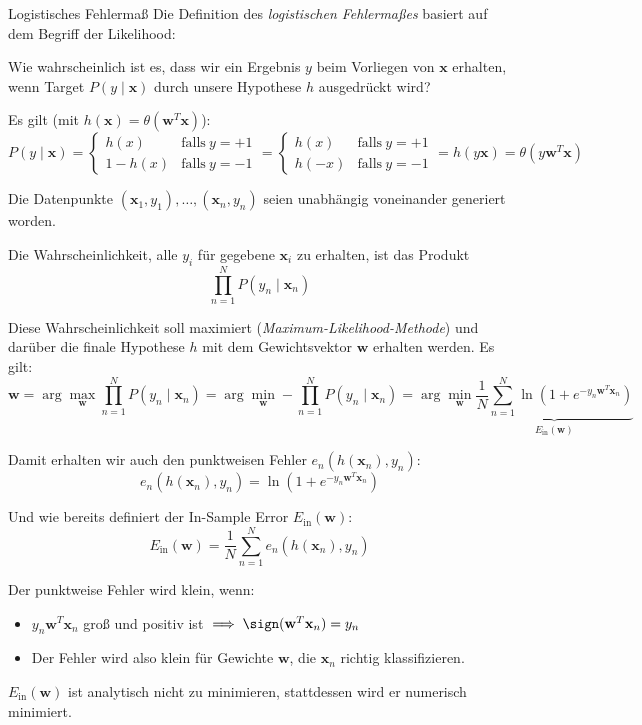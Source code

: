 \begin{defi}{Logistisches Fehlermaß}
    Die Definition des \emph{logistischen Fehlermaßes} basiert auf dem Begriff der Likelihood:

    Wie wahrscheinlich ist es, dass wir ein Ergebnis $y$ beim Vorliegen von $\mathbf{x}$ erhalten, wenn Target $P(y \mid \mathbf{x})$ durch unsere Hypothese $h$ ausgedrückt wird?

    Es gilt (mit $h(\mathbf{x}) = \theta(\mathbf{w}^T \mathbf{x})$):
    \[
        P(y \mid \mathbf{x}) = \begin{cases}
            h(x)     & \text{falls} \ y = +1 \\
            1 - h(x) & \text{falls} \ y = -1
        \end{cases}
        = \begin{cases}
            h(x)  & \text{falls} \ y = +1 \\
            h(-x) & \text{falls} \ y = -1
        \end{cases}
        = h(y \mathbf{x}) = \theta (y \mathbf{w}^T \mathbf{x})
    \]

    Die Datenpunkte $(\mathbf{x}_1, y_1), \ldots, (\mathbf{x}_n, y_n)$ seien unabhängig voneinander generiert worden.

    Die Wahrscheinlichkeit, alle $y_i$ für gegebene $\mathbf{x}_i$ zu erhalten, ist das Produkt
    \[
        \prod_{n=1}^N P(y_n \mid \mathbf{x}_n)
    \]

    Diese Wahrscheinlichkeit soll maximiert (\emph{Maximum-Likelihood-Methode}) und darüber die finale Hypothese $h$ mit dem Gewichtsvektor $\mathbf{w}$ erhalten werden.
    Es gilt:
    \[
        \mathbf{w} = \arg\max_{\mathbf{w}} \prod_{n=1}^N P(y_n \mid \mathbf{x}_n) = \arg\min_{\mathbf{w}} -\prod_{n=1}^N P(y_n \mid \mathbf{x}_n) = \arg\min_{\mathbf{w}} \underbrace{\frac{1}{N} \sum_{n=1}^N \ln \left( 1 + e^{-y_n \mathbf{w}^T \mathbf{x}_n} \right)}_{E_\text{in}(\mathbf{w})}
    \]

    Damit erhalten wir auch den punktweisen Fehler $e_n(h(\mathbf{x}_n), y_n)$:
    \[
        e_n(h(\mathbf{x}_n), y_n) = \ln \left( 1 + e^{-y_n \mathbf{w}^T \mathbf{x}_n} \right)
    \]

    Und wie bereits definiert der In-Sample Error $E_\text{in}(\mathbf{w})$:
    \[
        E_\text{in}(\mathbf{w}) = \frac{1}{N} \sum_{n=1}^N e_n(h(\mathbf{x}_n), y_n)
    \]

    Der punktweise Fehler wird klein, wenn:
    \begin{itemize}
        \item $y_n \mathbf{w}^T \mathbf{x}_n$ groß und positiv ist $\implies \sign(\mathbf{w}^T \mathbf{x}_n) = y_n$
        \item Der Fehler wird also klein für Gewichte $\mathbf{w}$, die $\mathbf{x}_n$ richtig klassifizieren.
    \end{itemize}

    $E_\text{in}(\mathbf{w})$ ist analytisch nicht zu minimieren, stattdessen wird er numerisch minimiert.
\end{defi}

